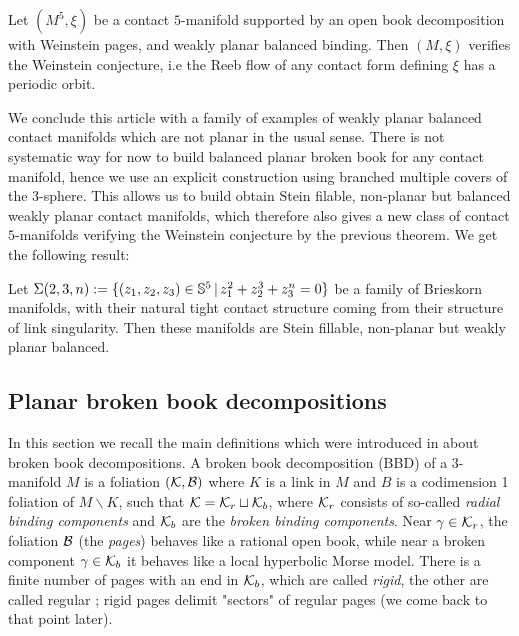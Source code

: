 \documentclass[../main.tex]{subfiles}
\begin{document}
\begin{theorem}\label{t:théorème_4}
Let $(M^5,\xi)$ be a contact $5$-manifold supported by an open book decomposition with Weinstein pages, and weakly planar balanced binding. Then $(M,\xi)$ verifies the Weinstein conjecture, i.e the Reeb flow of any contact form defining $\xi$ has a periodic orbit.
\end{theorem}


We conclude this article with a family of examples of weakly planar balanced contact manifolds which are not planar in the usual sense. There is not systematic way for now to build balanced planar broken book for any contact manifold, hence we use an explicit construction using branched multiple covers of the $3$-sphere. This allows us to build obtain Stein filable, non-planar but balanced weakly planar contact manifolds, which therefore also gives a new class of contact $5$-manifolds verifying the Weinstein conjecture by the previous theorem. We get the following result:

\begin{theorem}\label{t:théorème_5}
Let $\Sigma(2,3,n):=\{(z_1,z_2,z_3)\in \mathbb{S}^5\,|\, z_1^2 + z_2^3+ z_3^n = 0 \}$ be a family of Brieskorn manifolds, with their natural tight contact structure coming from their structure of link singularity. Then these manifolds are Stein fillable, non-planar but weakly planar balanced. 
\end{theorem}





\subsection{Planar broken book decompositions}

In this section we recall the main definitions which were introduced in \cite{colin_existence_2022} about broken book decompositions. A broken book decomposition (BBD) of a 3-manifold $M$ is a foliation $(\mathcal{K},\mathcal{B})$ where $K$ is a link in $M$ and $B$ is a codimension 1 foliation of $M\backslash K$, such that $\mathcal{K} = \mathcal{K}_r\sqcup \mathcal{K}_b$, where $\mathcal{K}_r$ consists of so-called \textit{radial binding components} and $\mathcal{K}_b$ are the \textit{broken binding components}. Near $\gamma\in \mathcal{K}_r$, the foliation $\mathcal{B}$ (the \textit{pages}) behaves like a rational open book, while near a broken component $\gamma\in\mathcal{K}_b$ it behaves like a local hyperbolic Morse model. There is a finite number of pages with an end in $\mathcal{K}_b$, which are called \textit{rigid}, the other are called regular ; rigid pages delimit "sectors" of regular pages (we come back to that point later).\\
\end{document}

